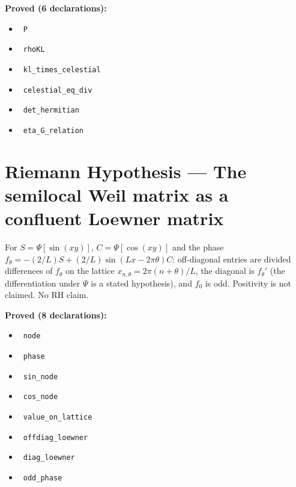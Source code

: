 \documentclass{report}
\theoremstyle{definition}
\begin{document}
\noindent\textbf{Proved (6 declarations):}
\begin{itemize}
  \item {}\leanok\ \texttt{P}
  \item {}\leanok\ \texttt{rhoKL}
  \item {}\leanok\ \texttt{kl\_times\_celestial}
  \item {}\leanok\ \texttt{celestial\_eq\_div}
  \item {}\leanok\ \texttt{det\_hermitian}
  \item {}\leanok\ \texttt{eta\_G\_relation}
\end{itemize}

\section{Riemann Hypothesis --- The semilocal Weil matrix as a confluent Loewner matrix}
For $S=\Psi[\sin(xy)]$, $C=\Psi[\cos(xy)]$ and the phase $f_\theta=-(2/L)S+(2/L)\sin(Lx-2\pi\theta)C$: off-diagonal entries are divided differences of $f_\theta$ on the lattice $x_{n,\theta}=2\pi(n+\theta)/L$, the diagonal is $f_\theta'$ (the differentiation under $\Psi$ is a stated hypothesis), and $f_0$ is odd. Positivity is not claimed. No RH claim.

\noindent\textbf{Proved (8 declarations):}
\begin{itemize}
  \item {}\leanok\ \texttt{node}
  \item {}\leanok\ \texttt{phase}
  \item {}\leanok\ \texttt{sin\_node}
  \item {}\leanok\ \texttt{cos\_node}
  \item {}\leanok\ \texttt{value\_on\_lattice}
  \item {}\leanok\ \texttt{offdiag\_loewner}
  \item {}\leanok\ \texttt{diag\_loewner}
  \item {}\leanok\ \texttt{odd\_phase}
\end{itemize}
\end{document}
